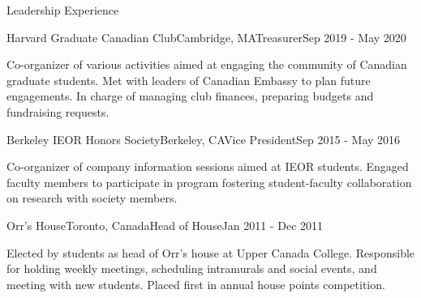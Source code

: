 \documentclass{resume} %
\begin{document}
\begin{rSection}{Leadership Experience}

\begin{rSubsection}{Harvard Graduate Canadian Club}{Cambridge, MA}{Treasurer}{Sep 2019 - May 2020}

\item Co-organizer of various activities aimed at engaging the community of Canadian graduate students. Met with leaders of Canadian Embassy to plan future engagements. In charge of managing club finances, preparing budgets and fundraising requests.

\end{rSubsection}

\begin{rSubsection}{Berkeley IEOR Honors Society}{Berkeley, CA}{Vice President}{Sep 2015 - May 2016}

\item Co-organizer of company information sessions aimed at IEOR students. Engaged faculty members to participate in program fostering student-faculty collaboration on research with society members.

\end{rSubsection}

\begin{rSubsection}{Orr's House}{Toronto, Canada}{Head of House}{Jan 2011 - Dec 2011}

\item Elected by students as head of Orr's house at Upper Canada College. Responsible for holding weekly meetings, scheduling intramurals and social events, and meeting with new students. Placed first in annual house points competition.
\end{rSubsection}


\end{rSection}

\end{document}
